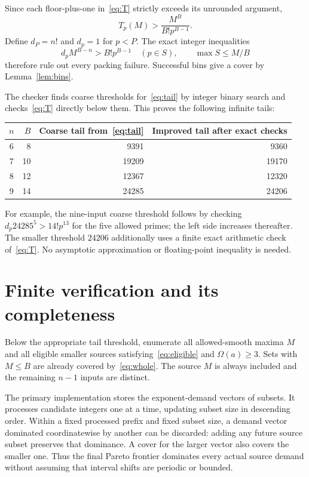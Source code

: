 \documentclass[11pt,a4paper]{article}
\begin{document}
Since each floor-plus-one in~\eqref{eq:T} strictly exceeds its unrounded argument,
\[
 T_p(M)>\frac{M^B}{B!p^{B-1}}.
\]
Define $d_P=n!$ and $d_p=1$ for $p<P$. The exact integer inequalities
\begin{equation}\label{eq:tail}
 d_pM^{B-n}>B!p^{B-1}\quad(p\in S),\qquad \max S\le M/B
\end{equation}
therefore rule out every packing failure. Successful bins give a cover by Lemma~\ref{lem:bins}.

The checker finds coarse thresholds for~\eqref{eq:tail} by integer binary search and checks~\eqref{eq:T} directly below them. This proves the following infinite tails:
\begin{center}
\begin{tabular}{@{}crrr@{}}
\toprule
$n$ & $B$ & Coarse tail from~\eqref{eq:tail} & Improved tail after exact checks\\
\midrule
6&8&9391&9360\\
7&10&19209&19170\\
8&12&12367&12320\\
9&14&24285&24206\\
\bottomrule
\end{tabular}
\end{center}
For example, the nine-input coarse threshold follows by checking
$d_p24285^5>14!p^{13}$ for the five allowed primes; the left side increases thereafter. The smaller threshold $24206$ additionally uses a finite exact arithmetic check of~\eqref{eq:T}. No asymptotic approximation or floating-point inequality is needed.

\section{Finite verification and its completeness}
Below the appropriate tail threshold, enumerate all allowed-smooth maxima $M$ and all eligible smaller sources satisfying~\eqref{eq:eligible} and $\Omega(a)\ge3$. Sets with $M\le B$ are already covered by~\eqref{eq:whole}. The source $M$ is always included and the remaining $n-1$ inputs are distinct.

The primary implementation stores the exponent-demand vectors of subsets. It processes candidate integers one at a time, updating subset size in descending order. Within a fixed processed prefix and fixed subset size, a demand vector dominated coordinatewise by another can be discarded: adding any future source subset preserves that dominance. A cover for the larger vector also covers the smaller one. Thus the final Pareto frontier dominates every actual source demand without assuming that interval shifts are periodic or bounded.
\end{document}
